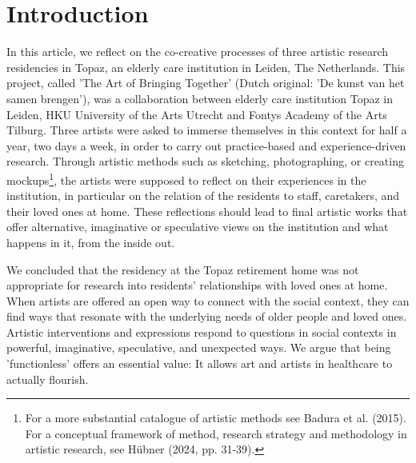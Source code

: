 \documentclass[authordate, empirical]{jote-new-article}
\author[1]{\mbox{Falk Hübner\orcid{0000-0002-1469-1282}}}
\affil[1]{Fontys Academy of the Arts}
\author[2]{\mbox{Gjilke Keuning\orcid{0009-0003-6222-0420}}}
\affil[2]{HKU University of the Arts}
\author[1]{\mbox{Marijke Lucas\orcid{0009-0005-3219-3294}}}
\begin{document}
\begin{frontmatter}
  \maketitle
  \begin{abstract}
    \printabstracttext
  \end{abstract}
\end{frontmatter}


	\section{Introduction}



	In this article, we reflect on the co-creative processes of three artistic research residencies in Topaz, an elderly care institution in Leiden, The Netherlands. This project, called 'The Art of Bringing Together' (Dutch original: 'De kunst van het samen brengen'), was a collaboration between elderly care institution Topaz in Leiden, HKU University of the Arts Utrecht and Fontys Academy of the Arts Tilburg. Three artists were asked to immerse themselves in this context for half a year, two days a week, in order to carry out practice-based and experience-driven research. Through artistic methods such as sketching, photographing, or creating mockups\footnote{ For a more substantial catalogue of artistic methods see Badura et al. (2015). For a conceptual framework of method, research strategy and methodology in artistic research, see Hübner (2024, pp. 31-39).}, the artists were supposed to reflect on their experiences in the institution, in particular on the relation of the residents to staff, caretakers, and their loved ones at home. These reflections should lead to final artistic works that offer alternative, imaginative or speculative views on the institution and what happens in it, from the inside out.

	\begin{flushleft}
		\begin{takeHomeMessage}
			We concluded that the residency at the Topaz retirement home was not appropriate for research into residents' relationships with loved ones at home. When artists are offered an open way to connect with the social context, they can find ways that resonate with the underlying needs of older people and loved ones. Artistic interventions and expressions respond to questions in social contexts in powerful, imaginative, speculative, and unexpected ways. We argue that being 'functionless' offers an essential value: It allows art and artists in healthcare to actually flourish.
		\end{takeHomeMessage}
	\end{flushleft}
	
\end{document}
